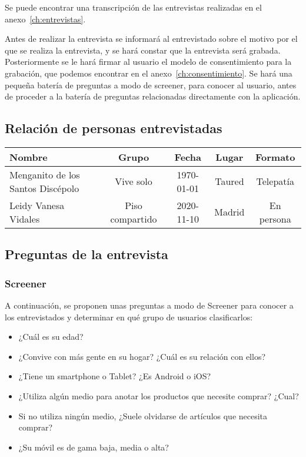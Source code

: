 Se puede encontrar una transcripción de las entrevistas realizadas en el anexo~\ref{ch:entrevistas}.

Antes de realizar la entrevista se informará al entrevistado sobre el motivo por el que se realiza la entrevista, y se hará constar que la entrevista será grabada. Posteriormente se le hará firmar al usuario el modelo de consentimiento para la grabación, que podemos encontrar en el anexo~\ref{ch:consentimiento}.
Se hará una pequeña batería de preguntas a modo de screener, para conocer al usuario, antes de proceder a la batería de preguntas relacionadas directamente con la aplicación.

\subsection{Relación de personas entrevistadas}
\begin{table}[h]
    \centering\small
    \begin{threeparttable}
    \begin{tabularx}{.9\textwidth}{@{}Xcccc@{}}
    \rowcolor{red!20}
    \textbf{Nombre} & \textbf{Grupo} & \textbf{Fecha} & \textbf{Lugar} & \textbf{Formato} \\
    \toprule
    Menganito de los Santos Discépolo & Vive solo & 1970-01-01 & Taured & Telepatía \\
    Leidy Vanesa Vidales & Piso compartido & 2020-11-10 & Madrid & En persona
    \end{tabularx}
    \end{threeparttable}
\end{table}

\subsection{Preguntas de la entrevista}
\subsubsection{Screener}
A continuación, se proponen unas preguntas a modo de Screener para conocer a los entrevistados y determinar en qué grupo de usuarios clasificarlos:

\begin{itemize}
    \item ¿Cuál es su edad?
    \item ¿Convive con más gente en su hogar? ¿Cuál es su relación con ellos?
    \item ¿Tiene un smartphone o Tablet? ¿Es Android o iOS?
    \item ¿Utiliza algún medio para anotar los productos que necesite comprar? ¿Cual?
    \item Si no utiliza ningún medio, ¿Suele olvidarse de artículos que necesita comprar?
    \item ¿Su móvil es de gama baja, media o alta?
\end{itemize}

